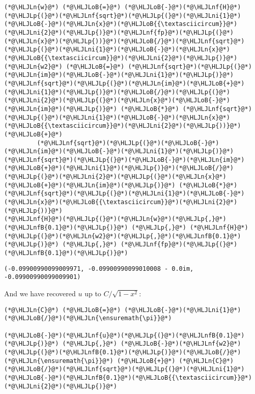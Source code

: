 \documentclass[12pt,a4paper]{article}
\newcommand{\HLJLn}[1]{#1}
\newcommand{\HLJLnf}[1]{\textcolor[RGB]{66,102,213}{#1}}
\newcommand{\HLJLnfB}[1]{\textcolor[RGB]{59,151,46}{#1}}
\newcommand{\HLJLni}[1]{\textcolor[RGB]{59,151,46}{#1}}
\newcommand{\HLJLoB}[1]{\textcolor[RGB]{102,102,102}{\textbf{#1}}}
\newcommand{\HLJLp}[1]{#1}
\begin{document}
\begin{lstlisting}
(*@\HLJLn{w}@*) (*@\HLJLoB{=}@*) (*@\HLJLoB{-}@*)(*@\HLJLnf{H}@*)(*@\HLJLp{(}@*)(*@\HLJLnf{sqrt}@*)(*@\HLJLp{(}@*)(*@\HLJLni{1}@*)(*@\HLJLoB{-}@*)(*@\HLJLn{x}@*)(*@\HLJLoB{{\textasciicircum}}@*)(*@\HLJLni{2}@*)(*@\HLJLp{)}@*)(*@\HLJLnf{fp}@*)(*@\HLJLp{(}@*)(*@\HLJLn{x}@*)(*@\HLJLp{))}@*)(*@\HLJLoB{/}@*)(*@\HLJLnf{sqrt}@*)(*@\HLJLp{(}@*)(*@\HLJLni{1}@*)(*@\HLJLoB{-}@*)(*@\HLJLn{x}@*)(*@\HLJLoB{{\textasciicircum}}@*)(*@\HLJLni{2}@*)(*@\HLJLp{)}@*)
(*@\HLJLn{w2}@*) (*@\HLJLoB{=}@*) (*@\HLJLnf{sqrt}@*)(*@\HLJLp{(}@*)(*@\HLJLn{im}@*)(*@\HLJLoB{-}@*)(*@\HLJLni{1}@*)(*@\HLJLp{)}@*)(*@\HLJLnf{sqrt}@*)(*@\HLJLp{(}@*)(*@\HLJLn{im}@*)(*@\HLJLoB{+}@*)(*@\HLJLni{1}@*)(*@\HLJLp{)}@*)(*@\HLJLoB{/}@*)(*@\HLJLp{(}@*)(*@\HLJLni{2}@*)(*@\HLJLp{(}@*)(*@\HLJLn{x}@*)(*@\HLJLoB{-}@*)(*@\HLJLn{im}@*)(*@\HLJLp{)}@*) (*@\HLJLoB{*}@*) (*@\HLJLnf{sqrt}@*)(*@\HLJLp{(}@*)(*@\HLJLni{1}@*)(*@\HLJLoB{-}@*)(*@\HLJLn{x}@*)(*@\HLJLoB{{\textasciicircum}}@*)(*@\HLJLni{2}@*)(*@\HLJLp{))}@*) (*@\HLJLoB{+}@*)
         (*@\HLJLnf{sqrt}@*)(*@\HLJLp{(}@*)(*@\HLJLoB{-}@*)(*@\HLJLn{im}@*)(*@\HLJLoB{-}@*)(*@\HLJLni{1}@*)(*@\HLJLp{)}@*)(*@\HLJLnf{sqrt}@*)(*@\HLJLp{(}@*)(*@\HLJLoB{-}@*)(*@\HLJLn{im}@*)(*@\HLJLoB{+}@*)(*@\HLJLni{1}@*)(*@\HLJLp{)}@*)(*@\HLJLoB{/}@*)(*@\HLJLp{(}@*)(*@\HLJLni{2}@*)(*@\HLJLp{(}@*)(*@\HLJLn{x}@*)(*@\HLJLoB{+}@*)(*@\HLJLn{im}@*)(*@\HLJLp{)}@*) (*@\HLJLoB{*}@*) (*@\HLJLnf{sqrt}@*)(*@\HLJLp{(}@*)(*@\HLJLni{1}@*)(*@\HLJLoB{-}@*)(*@\HLJLn{x}@*)(*@\HLJLoB{{\textasciicircum}}@*)(*@\HLJLni{2}@*)(*@\HLJLp{))}@*)
(*@\HLJLnf{H}@*)(*@\HLJLp{(}@*)(*@\HLJLn{w}@*)(*@\HLJLp{,}@*)(*@\HLJLnfB{0.1}@*)(*@\HLJLp{)}@*) (*@\HLJLp{,}@*) (*@\HLJLnf{H}@*)(*@\HLJLp{(}@*)(*@\HLJLn{w2}@*)(*@\HLJLp{,}@*)(*@\HLJLnfB{0.1}@*)(*@\HLJLp{)}@*) (*@\HLJLp{,}@*) (*@\HLJLnf{fp}@*)(*@\HLJLp{(}@*)(*@\HLJLnfB{0.1}@*)(*@\HLJLp{)}@*)
\end{lstlisting}

\begin{lstlisting}
(-0.09900990099009971, -0.09900990099010008 - 0.0im, -0.09900990099009901)
\end{lstlisting}


And we have recovered $u$ up to $C/\sqrt{1-x^2}$:


\begin{lstlisting}
(*@\HLJLn{C}@*) (*@\HLJLoB{=}@*) (*@\HLJLoB{-}@*)(*@\HLJLni{1}@*)(*@\HLJLoB{/}@*)(*@\HLJLn{\ensuremath{\pi}}@*)

(*@\HLJLoB{-}@*)(*@\HLJLnf{u}@*)(*@\HLJLp{(}@*)(*@\HLJLnfB{0.1}@*)(*@\HLJLp{)}@*) (*@\HLJLp{,}@*) (*@\HLJLoB{-}@*)(*@\HLJLnf{w2}@*)(*@\HLJLp{(}@*)(*@\HLJLnfB{0.1}@*)(*@\HLJLp{)}@*)(*@\HLJLoB{/}@*)(*@\HLJLn{\ensuremath{\pi}}@*) (*@\HLJLoB{+}@*) (*@\HLJLn{C}@*)(*@\HLJLoB{/}@*)(*@\HLJLnf{sqrt}@*)(*@\HLJLp{(}@*)(*@\HLJLni{1}@*)(*@\HLJLoB{-}@*)(*@\HLJLnfB{0.1}@*)(*@\HLJLoB{{\textasciicircum}}@*)(*@\HLJLni{2}@*)(*@\HLJLp{)}@*)
\end{lstlisting}
\end{document}

